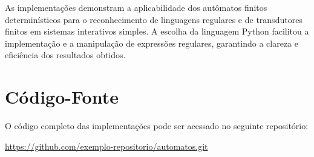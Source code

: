 \documentclass[12pt]{article}
\begin{document}
As implementações demonstram a aplicabilidade dos autômatos finitos determinísticos para o reconhecimento de linguagens regulares e de transdutores finitos em sistemas interativos simples. A escolha da linguagem Python facilitou a implementação e a manipulação de expressões regulares, garantindo a clareza e eficiência dos resultados obtidos.

\appendix

\section{Código-Fonte}

O código completo das implementações pode ser acessado no seguinte repositório:

\url{https://github.com/exemplo-repositorio/automatos.git}
\end{document}
